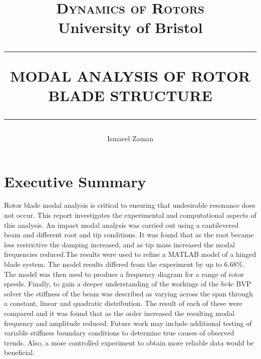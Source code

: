 \documentclass[11pt]{article}
\newcommand{\HRule}[1]{\rule{\linewidth}{#1}}
\begin{document}
\title{ \normalsize \textsc{Dynamics of Rotors}
		\\ 		University of Bristol \\
		\HRule{1pt}
		\LARGE \textbf{\uppercase{Modal Analysis of Rotor Blade Structure}}
		\HRule{2pt} \normalsize}
		\vspace{-1cm}
\author{\vspace{-1cm}Ismaeel Zaman}
\maketitle



\section*{Executive Summary}
Rotor blade modal analysis is critical to ensuring that undesirable resonance does not occur.
This report investigates the experimental and computational aspects of this analysis. An impact modal analysis was carried out using a cantilevered beam and different root and tip conditions. It was found that as the root became less restrictive the damping increased, and as tip mass increased the modal frequencies reduced.The results were used to refine a MATLAB model of a hinged blade system. The model results differed from the experiment by up to $6.68\%$. The model was then used to produce a frequency diagram for a range of rotor speeds. Finally, to gain a deeper understanding of the workings of the $bv4c$ BVP solver the stiffness of the beam was described as varying across the span  through a constant, linear and quadratic distribution. The result of each of these were compared and it was found that as the order increased the resulting modal frequency and amplitude reduced. Future work may include additional testing of variable stiffness boundary conditions to determine true causes of observed trends. Also, a more controlled experiment to obtain more reliable data would be beneficial.
\end{document}
